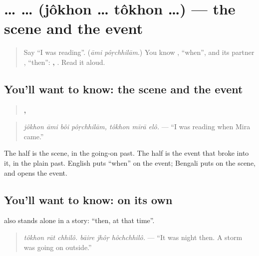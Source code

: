 \section[\texorpdfstring{\bn{যখন} … \bn{তখন} … (jôkhon … tôkhon …)}{যখন … তখন … (jôkhon … tôkhon …)}]{ …  … (jôkhon … tôkhon …) — the scene and the event}

\label{lesson:BN-C266-jokhon-tokhon}



\begin{quote}
Say \textquotedblleft{}I was reading\textquotedblright{}. (\emph{āmi pôṛchhilām}.) You know \textbf{}, \textquotedblleft{}when\textquotedblright{}, and its partner \textbf{}, \textquotedblleft{}then\textquotedblright{}: \textbf{  ,   }. Read it aloud.
\end{quote}

\subsection*{You'll want to know: the scene and the event}
\begin{quote}
\textbf{   ,   }
\end{quote}

\begin{quote}
\emph{jôkhon āmi bôi pôṛchhilām, tôkhon mīrā elô.} — \textquotedblleft{}I was reading when Mira came.\textquotedblright{}
\end{quote}

The \textbf{} half is the scene, in the going-on past. The \textbf{} half is the event that broke into it, in the plain past. English puts \textquotedblleft{}when\textquotedblright{} on the event; Bengali puts \textbf{} on the scene, and \textbf{} opens the event.

\subsection*{You'll want to know:  on its own}
\textbf{} also stands alone in a story: \textquotedblleft{}then, at that time\textquotedblright{}.

\begin{quote}
\textbf{     }
\end{quote}

\begin{quote}
\emph{tôkhon rāt chhilô. bāire jhôṛ hôchchhilô.} — \textquotedblleft{}It was night then. A storm was going on outside.\textquotedblright{}
\end{quote}

